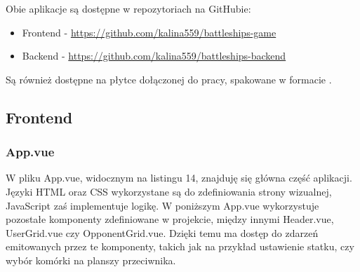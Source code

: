 
Obie aplikacje są dostępne w repozytoriach na GitHubie:
\begin{itemize}
    \item Frontend - \url{https://github.com/kalina559/battleships-game}
    \item Backend - \url{https://github.com/kalina559/battleships-backend}
\end{itemize}

Są również dostępne na płytce dołączonej do pracy, spakowane w formacie .

\tocless\subsection{Frontend}

\tocless\subsubsection{App.vue}

W pliku App.vue, widocznym na listingu 14, znajduję się główna część aplikacji. Języki HTML oraz CSS wykorzystane są do zdefiniowania strony wizualnej, JavaScript zaś implementuje logikę. W poniższym 
App.vue wykorzystuje pozostałe komponenty zdefiniowane w projekcie, między innymi Header.vue, UserGrid.vue czy OpponentGrid.vue. Dzięki temu ma dostęp do zdarzeń emitowanych przez te komponenty, takich jak na przykład ustawienie statku, czy wybór komórki na planszy przeciwnika.

